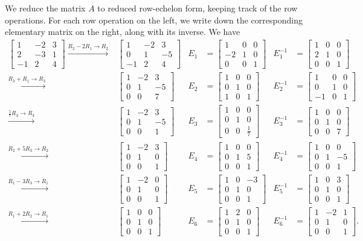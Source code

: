 \documentclass[letterpaper,12pt]{article}
\newcommand{\bbm}{\begin{bmatrix}}
\newcommand{\ebm}{\end{bmatrix}}
\begin{document}
\begin{enumerate}
We reduce the matrix $A$ to reduced row-echelon form, keeping track of the row operations. For each row operation on the left, we write down the corresponding elementary matrix on the right, along with its inverse. We have
\begin{align*}
 \bbm 1&-2&3\\2&-3&1\\-1&2&4\ebm \xrightarrow{R_2-2R_1 \to R_2} & \bbm 1&-2&3\\0&1&-5\\-1&2&4\ebm & E_1 & = \bbm 1&0&0\\-2&1&0\\0&0&1\ebm & E_1^{-1} & = \bbm 1&0&0\\2&1&0\\0&0&1\ebm\\
 \xrightarrow{R_3+R_1\to R_3} & \bbm 1&-2&3\\0&1&-5\\0&0&7\ebm & E_2 & = \bbm 1&0&0\\0&1&0\\1&0&1\ebm & E_2^{-1} & = \bbm 1&0&0\\0&1&0\\-1&0&1\ebm\\
 \xrightarrow{\frac{1}{7}R_3\to R_3} & \bbm 1&-2&3\\0&1&-5\\0&0&1\ebm & E_3 & = \bbm 1&0&0\\0&1&0\\0&0&\frac{1}{7}\ebm & E_3^{-1} & = \bbm 1&0&0\\0&1&0\\0&0&7\ebm\\
 \xrightarrow{R_2+5R_3\to R_2} & \bbm 1&-2&3\\0&1&0\\0&0&1\ebm & E_4 & = \bbm 1&0&0\\0&1&5\\0&0&1\ebm & E_4^{-1} & = \bbm 1&0&0\\0&1&-5\\0&0&1\ebm\\
 \xrightarrow{R_1-3R_3\to R_1} & \bbm 1&-2&0\\0&1&0\\0&0&1\ebm &  E_5 & = \bbm 1&0&-3\\0&1&0\\0&0&1\ebm & E_5^{-1} & = \bbm 1&0&3\\0&1&0\\0&0&1\ebm \\
 \xrightarrow{R_1+2R_2\to R_1} & \bbm 1&0&0\\0&1&0\\0&0&1\ebm & E_6 & = \bbm 1&2&0\\0&1&0\\0&0&1\ebm & E_6^{-1} & = \bbm 1&-2&1\\0&1&0\\0&0&1\ebm.

\end{align*}
\end{enumerate}
\end{document}
